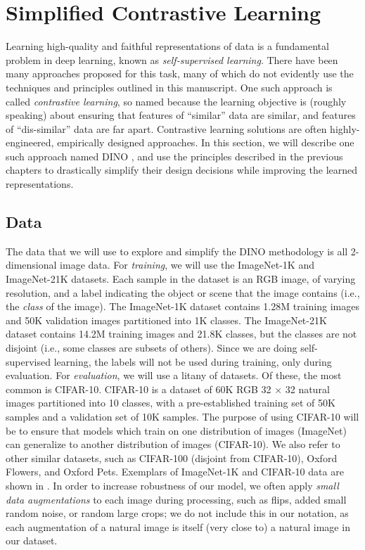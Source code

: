 \documentclass[\toplevelprefix/book-main.tex]{subfiles}
\begin{document}
\section{Simplified Contrastive Learning}\label{sec:contrastive_learning}

Learning high-quality and faithful representations of data is a fundamental problem in deep learning, known as \textit{self-supervised learning}. There have been many approaches proposed for this task, many of which do not evidently use the techniques and principles outlined in this manuscript. One such approach is called \textit{contrastive learning}, so named because the learning objective is (roughly speaking) about ensuring that features of ``similar'' data are similar, and features of ``dis-similar'' data are far apart. Contrastive learning solutions are often highly-engineered, empirically designed approaches. In this section, we will describe one such approach named DINO \citep{caron2021emerging}, and use the principles described in the previous chapters to drastically simplify their design decisions while improving the learned representations.

\subsection{Data}\label{sub:contrastive_learning_data}

The data that we will use to explore and simplify the DINO methodology is all 2-dimensional image data. For \textit{training}, we will use the ImageNet-1K and ImageNet-21K datasets. Each sample in the dataset is an RGB image, of varying resolution, and a label indicating the object or scene that the image contains (i.e., the \textit{class} of the image). The ImageNet-1K dataset contains 1.28M training images and 50K validation images partitioned into 1K classes. The ImageNet-21K dataset contains 14.2M training images and 21.8K classes, but the classes are not disjoint (i.e., some classes are subsets of others). Since we are doing self-supervised learning, the labels will not be used during training, only during evaluation. For \textit{evaluation}, we will use a litany of datasets. Of these, the most common is CIFAR-10. CIFAR-10 is a dataset of 60K RGB 32 \(\times\) 32 natural images partitioned into 10 classes, with a pre-established training set of 50K samples and a validation set of 10K samples. The purpose of using CIFAR-10 will be to ensure that models which train on one distribution of images (ImageNet) can generalize to another distribution of images (CIFAR-10). We also refer to other similar datasets, such as CIFAR-100 (disjoint from CIFAR-10), Oxford Flowers, and Oxford Pets. Exemplars of ImageNet-1K and CIFAR-10 data are shown in . In order to increase robustness of our model, we often apply \textit{small data augmentations} to each image during processing, such as flips, added small random noise, or random large crops; we do not include this in our notation, as each augmentation of a natural image is itself (very close to) a natural image in our dataset.
\end{document}
